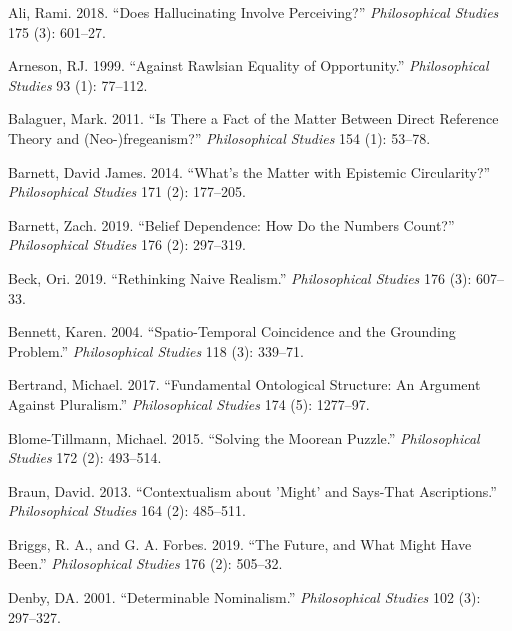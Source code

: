 \documentclass[
  10pt,
  letterpaper,
  DIV=11,
  numbers=noendperiod,
  twoside]{scrartcl}
\newlength{\cslhangindent}
\newenvironment{CSLReferences}[2] %
 {\begin{list}{}{%
  \setlength{\itemindent}{0pt}
  \setlength{\leftmargin}{0pt}
  \setlength{\parsep}{0pt}
  \ifodd #1
   \setlength{\leftmargin}{\cslhangindent}
   \setlength{\itemindent}{-1\cslhangindent}
  \fi
  \setlength{\itemsep}{#2\baselineskip}}}
 {\end{list}}
\begin{document}
\label{refs}
\begin{CSLReferences}{1}{0}
Ali, Rami. 2018. {``Does Hallucinating Involve Perceiving?''}
\emph{Philosophical Studies} 175 (3): 601--27.

Arneson, RJ. 1999. {``Against Rawlsian Equality of Opportunity.''}
\emph{Philosophical Studies} 93 (1): 77--112.

Balaguer, Mark. 2011. {``Is There a Fact of the Matter Between Direct
Reference Theory and (Neo-)fregeanism?''} \emph{Philosophical Studies}
154 (1): 53--78.

Barnett, David James. 2014. {``What's the Matter with Epistemic
Circularity?''} \emph{Philosophical Studies} 171 (2): 177--205.

Barnett, Zach. 2019. {``Belief Dependence: How Do the Numbers Count?''}
\emph{Philosophical Studies} 176 (2): 297--319.

Beck, Ori. 2019. {``Rethinking Naive Realism.''} \emph{Philosophical
Studies} 176 (3): 607--33.

Bennett, Karen. 2004. {``Spatio-Temporal Coincidence and the Grounding
Problem.''} \emph{Philosophical Studies} 118 (3): 339--71.

Bertrand, Michael. 2017. {``Fundamental Ontological Structure: An
Argument Against Pluralism.''} \emph{Philosophical Studies} 174 (5):
1277--97.

Blome-Tillmann, Michael. 2015. {``Solving the Moorean Puzzle.''}
\emph{Philosophical Studies} 172 (2): 493--514.

Braun, David. 2013. {``Contextualism about 'Might' and Says-That
Ascriptions.''} \emph{Philosophical Studies} 164 (2): 485--511.

Briggs, R. A., and G. A. Forbes. 2019. {``The Future, and What Might
Have Been.''} \emph{Philosophical Studies} 176 (2): 505--32.

Denby, DA. 2001. {``Determinable Nominalism.''} \emph{Philosophical
Studies} 102 (3): 297--327.


\end{CSLReferences}
\end{document}
